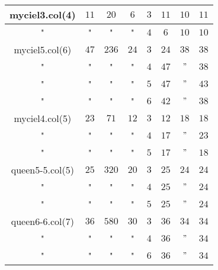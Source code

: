 \documentclass{beamer}
\begin{document}
\begin{table}[H]
\begin{center}
\begin{tabular}{|c|c|c|c|c|c|c|c|}
\hline
{\small myciel3.col(4)} & {\small $11$} & {\small $20$} & {\small $6$} & {\small $3$} & {\small $11$} & {\small $10$} & {\small $11$}\\
\hline
{\small "} & {\small "} & {\small "} & {\small "} & {\small $4$} & {\small $6$} & {\small $10$} & {\small $10$}\\
\hline
\hline
{\small myciel5.col(6)} & {\small $47$} & {\small $236$} & {\small $24$} & {\small $3$} & {\small $24$} & {\small $38$} & {\small $38$}\\
\hline
{\small "} & {\small "} & {\small "} & {\small "} & {\small $4$} & {\small $47$} & {\small $"$} & {\small $38$}\\
\hline
{\small "} & {\small "} & {\small "} & {\small "} & {\small $5$} & {\small $47$} & {\small $"$} & {\small $43$}\\
\hline
{\small "} & {\small "} & {\small "} & {\small "} & {\small $6$} & {\small $42$} & {\small $"$} & {\small $38$}\\
\hline
\hline
{\small myciel4.col(5)} & {\small $23$} & {\small $71$} & {\small $12$} & {\small $3$} & {\small $12$} & {\small $18$} & {\small $18$}\\
\hline
{\small "} & {\small "} & {\small "} & {\small "} & {\small $4$} & {\small $17$} & {\small $"$} & {\small $23$}\\
\hline
{\small "} & {\small "} & {\small "} & {\small "} & {\small $5$} & {\small $17$} & {\small $"$} & {\small $18$}\\
\hline
\hline
{\small queen5-5.col(5)} & {\small $25$} & {\small $320$} & {\small $20$} & {\small $3$} & {\small $25$} & {\small $24$} & {\small $24$}\\
\hline
{\small "} & {\small "} & {\small "} & {\small "} & {\small $4$} & {\small $25$} & {\small $"$} & {\small $24$}\\
\hline
{\small "} & {\small "} & {\small "} & {\small "} & {\small $5$} & {\small $25$} & {\small $"$} & {\small $24$}\\
\hline
\hline
{\small queen6-6.col(7)} & {\small $36$} & {\small $580$} & {\small $30$} & {\small $3$} & {\small $36$} & {\small $34$} & {\small $34$}\\
\hline
{\small "} & {\small "} & {\small "} & {\small "} & {\small $4$} & {\small $36$} & {\small $"$} & {\small $34$}\\
\hline
{\small "} & {\small "} & {\small "} & {\small "} & {\small $6$} & {\small $36$} & {\small $"$} & {\small $34$}\\

\end{tabular}
\end{center}
\end{table}
\end{document}
